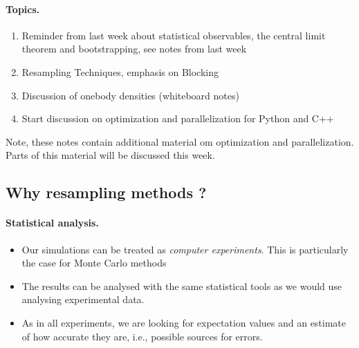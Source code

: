 \documentclass[%
oneside,                 %
final,                   %
10pt]{article}
\begin{document}
\paragraph{Topics.}
\begin{enumerate}
\item Reminder from last week about statistical observables, the central limit theorem and bootstrapping, see notes from last week

\item Resampling Techniques, emphasis on  Blocking 

\item Discussion of onebody densities (whiteboard notes)

\item Start discussion on optimization and parallelization for Python and C++
\end{enumerate}

\noindent



Note, these notes contain additional material om optimization and parallelization. Parts of this material will be discussed this week.

\subsection*{Why resampling methods ?}

\paragraph{Statistical analysis.}
\begin{itemize}
\item Our simulations can be treated as \emph{computer experiments}. This is particularly the case for Monte Carlo methods

\item The results can be analysed with the same statistical tools as we would use analysing experimental data.

\item As in all experiments, we are looking for expectation values and an estimate of how accurate they are, i.e., possible sources for errors.
\end{itemize}
\end{document}
